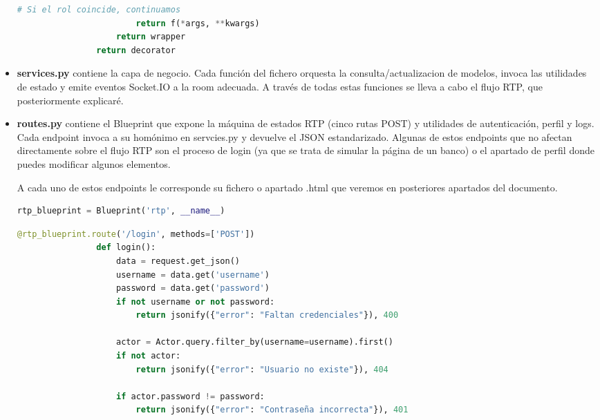 \begin{itemize}
\begin{lstlisting}[language=Python, style=custom, caption={Decorador para control de funciones}]
                        # Si el rol coincide, continuamos
                        return f(*args, **kwargs)
                    return wrapper
                return decorator

            \end{lstlisting}
    
    \item \textbf{services.py} contiene la capa de negocio. Cada función del fichero orquesta la consulta/actualizacion de modelos, invoca las utilidades de estado y emite eventos Socket.IO a la room adecuada.
            A través de todas estas funciones se lleva a cabo el flujo RTP, que posteriormente explicaré.
    
    \item \textbf{routes.py} contiene el Blueprint que expone la máquina de estados RTP (cinco rutas POST) y utilidades de autenticación, perfil y logs. Cada endpoint invoca a su homónimo en servcies.py y devuelve el JSON estandarizado.
            Algunas de estos endpoints que no afectan directamente sobre el flujo RTP son el proceso de login (ya que se trata de simular la página de un banco) o el apartado de perfil donde puedes modificar algunos elementos.

            A cada uno de estos endpoints le corresponde su fichero o apartado .html que veremos en posteriores apartados del documento.
            
            \begin{lstlisting}[language=Python, style=custom, caption={Declaración blueprint rtp}]
                rtp_blueprint = Blueprint('rtp', __name__)
            \end{lstlisting}

            \begin{lstlisting}[language=Python, style=custom, caption={Endpoint login}]
                @rtp_blueprint.route('/login', methods=['POST'])
                def login():
                    data = request.get_json()
                    username = data.get('username')
                    password = data.get('password')
                    if not username or not password:
                        return jsonify({"error": "Faltan credenciales"}), 400
                    
                    actor = Actor.query.filter_by(username=username).first()
                    if not actor:
                        return jsonify({"error": "Usuario no existe"}), 404
                    
                    if actor.password != password:
                        return jsonify({"error": "Contraseña incorrecta"}), 401
                    

\end{lstlisting}
\end{itemize}
